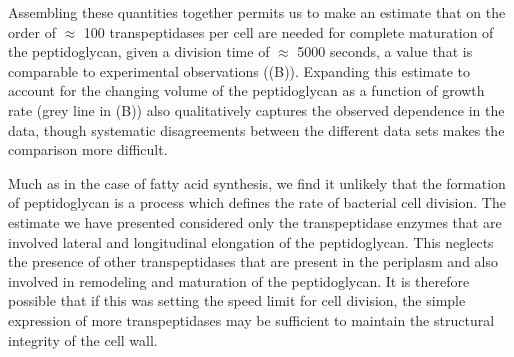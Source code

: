 Assembling these quantities together permits us to make an estimate that on the
order of $\approx$ 100 transpeptidases per cell are needed for complete maturation of the
peptidoglycan, given a division time of $\approx$ 5000 seconds, a value that is
comparable to experimental observations ((B)).
Expanding this estimate to account for the changing volume of the peptidoglycan
as a function of growth rate (grey line in (B)) also
qualitatively captures the observed dependence in the data, though systematic
disagreements between the different data sets makes the comparison more
difficult.

Much as in the case of fatty acid synthesis, we find it unlikely that the
formation of peptidoglycan is a process which defines the rate of bacterial
cell division. The estimate we have presented considered only the
transpeptidase enzymes that are involved lateral and longitudinal elongation
of the peptidoglycan. This neglects the presence of other transpeptidases
that are present in the periplasm and also involved in remodeling and
maturation of the peptidoglycan. It is therefore possible that if this was
setting the speed limit for cell division, the simple expression of more
transpeptidases may be sufficient to maintain the structural integrity of the
cell wall.

